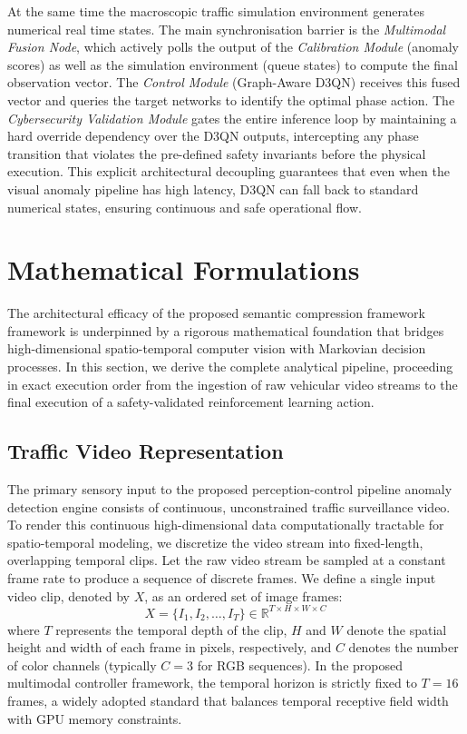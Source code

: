 \documentclass[conference]{IEEEtran}
\begin{document}
At the same time the macroscopic traffic simulation environment generates numerical real time states. The main synchronisation barrier is the \textit{Multimodal Fusion Node}, which actively polls the output of the \textit{Calibration Module} (anomaly scores) as well as the simulation environment (queue states) to compute the final observation vector.  The \textit{Control Module} (Graph-Aware D3QN) receives this fused vector and queries the target networks to identify the optimal phase action. The \textit{Cybersecurity Validation Module} gates the entire inference loop by maintaining a hard override dependency over the D3QN outputs, intercepting any phase transition that violates the pre-defined safety invariants before the physical execution. This explicit architectural decoupling guarantees that even when the visual anomaly pipeline has high latency, D3QN can fall back to standard numerical states, ensuring continuous and safe operational flow.


\section{Mathematical Formulations}
\label{sec:math_formulations}

The architectural efficacy of the proposed semantic compression framework framework is underpinned by a rigorous mathematical foundation that bridges high-dimensional spatio-temporal computer vision with Markovian decision processes. In this section, we derive the complete analytical pipeline, proceeding in exact execution order from the ingestion of raw vehicular video streams to the final execution of a safety-validated reinforcement learning action.

\subsection{Traffic Video Representation}
\label{subsec:video_representation}

The primary sensory input to the proposed perception-control pipeline anomaly detection engine consists of continuous, unconstrained traffic surveillance video. To render this continuous high-dimensional data computationally tractable for spatio-temporal modeling, we discretize the video stream into fixed-length, overlapping temporal clips. Let the raw video stream be sampled at a constant frame rate to produce a sequence of discrete frames. We define a single input video clip, denoted by $X$, as an ordered set of image frames:
\begin{equation}
X = \{I_1, I_2, \dots, I_T\} \in \mathbb{R}^{T \times H \times W \times C}
\label{eq:video_clip}
\end{equation}
where $T$ represents the temporal depth of the clip, $H$ and $W$ denote the spatial height and width of each frame in pixels, respectively, and $C$ denotes the number of color channels (typically $C = 3$ for RGB sequences). In the proposed multimodal controller framework, the temporal horizon is strictly fixed to $T = 16$ frames, a widely adopted standard that balances temporal receptive field width with GPU memory constraints. 
\end{document}
